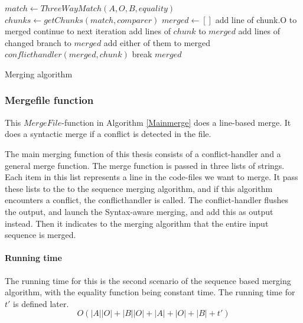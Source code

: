 \documentclass[11pt]{article}
\begin{document}
\begin{algorithm}
\begin{algorithmic}
   \State $match \gets ThreeWayMatch(A, O, B, equality)$
   \State $chunks \gets getChunks(match, comparer)$
   \State $merged \gets []$
            \State add line of chunk.O to merged
            \State continue to next iteration
        \EndIf
            \State add lines of $chunk$ to $merged$
        \Else
               \State add lines of changed branch to $merged$
            \Else
                   \State add either of them to merged
                \Else
                   \State $conflicthandler(merged, chunk)$
                      \State break
                   \EndIf
                \EndIf
			\EndIf
   		\EndIf
    \EndFor
	\State \Return $merged$
\EndFunction


\end{algorithmic}
\caption{Merging algorithm}
  \label{Genericmergingalgorithm}
\end{algorithm}

\subsubsection{Mergefile function}
This $MergeFile$-function in Algorithm \ref{Mainmerge} does a line-based merge. It does a syntactic merge if a conflict is detected in the file.

The main merging function of this thesis consists of a conflict-handler and a general merge function. The merge function is passed in three lists of strings. Each item in this list represents a line in the code-files we want to merge. It pass these lists to the to the sequence merging algorithm, and if this algorithm encounters a conflict, the conflicthandler is called. The conflict-handler flushes the output, and launch the Syntax-aware merging, and add this as output instead. Then it indicates to the merging algorithm that the entire input sequence is merged.

\paragraph{Running time} The running time for this is the second scenario of the sequence based merging algorithm, with the equality function being constant time. The running time for $t'$ is defined later. 
		\begin{equation}
			O(|A||O| + |B||O| + |A|+|O|+|B| + t') \nonumber
		\end{equation}
\end{document}
